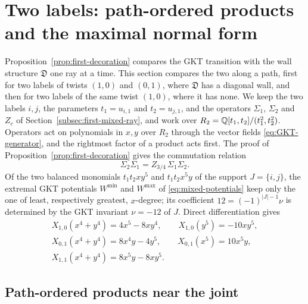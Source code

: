 \section{Two labels: path-ordered products and the maximal normal form}
\label{sec:positive-descendents}

Proposition~\ref{prop:first-decoration} compares the GKT transition with the
wall structure $\mathfrak D$ one ray at a time.  This section compares
the two along a path, first for two labels of twists $(1,0)$ and $(0,1)$,
where $\mathfrak D$ has a diagonal wall, and then for two labels of the same
twist $(1,0)$, where it has none.  We keep the two labels $i,j$, the
parameters $t_1=u_{i,1}$ and $t_2=u_{j,1}$, and the operators $\Sigma_1$,
$\Sigma_2$ and $Z_c$ of Section~\ref{subsec:first-mixed-ray}, and work over
$R_2=\mathbb Q[t_1,t_2]/(t_1^2,t_2^2)$.  Operators act on polynomials in $x,y$
over $R_2$ through the vector fields \eqref{eq:GKT-generator}, and the
rightmost factor of a product acts first.  The proof of
Proposition~\ref{prop:first-decoration} gives the commutation relation
\begin{equation}\label{eq:two-label-flows}
 \Sigma_2\Sigma_1=Z_{3/4}\,\Sigma_1\Sigma_2 .
\end{equation}
Of the two balanced monomials $t_1t_2xy^5$ and
$t_1t_2x^5y$ of the support $J=\{i,j\}$, the extremal GKT potentials
$W^{\min}$ and $W^{\max}$ of \eqref{eq:mixed-potentials} keep only the one of
least, respectively greatest, $x$-degree; its coefficient
$12=(-1)^{|J|-1}\nu$ is determined by the GKT invariant $\nu=-12$ of $J$.
Direct differentiation gives
\begin{equation}\label{eq:two-label-derivatives}
\begin{gathered}
 X_{1,0}(x^4+y^4)=4x^5-8xy^4,\qquad X_{1,0}(y^5)=-10xy^5,\\
 X_{0,1}(x^4+y^4)=8x^4y-4y^5,\qquad X_{0,1}(x^5)=10x^5y,\\
 X_{1,1}(x^4+y^4)=8x^5y-8xy^5.
\end{gathered}
\end{equation}

\subsection{Path-ordered products near the joint}

